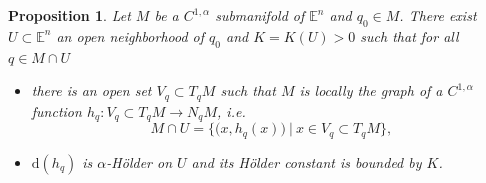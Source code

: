 \documentclass[10pt,a4paper]{amsart}
\newtheorem{proposition}{Proposition}
\newcommand{\E}{\mathbb{E}}
\renewcommand{\d}{\mathrm{d}}
\begin{document}
\begin{proposition} \label{prop: graph_constant_holder_global}
    Let $M$ be a $C^{1, \alpha}$ submanifold of $\E^n$ and $q_0 \in M$.
    There exist $U \subset \E^n$ an open neighborhood of $q_0$ and $K  = K(U) > 0$ such that for all $q \in  M \cap U$
    \begin{itemize}
        \item[(1)] there is an open set $V_q \subset T_q M$ such that $M$ is locally the graph of a $C^{1, \alpha}$ function $h_{q} : V_q \subset T_{q}M \to N_{q}M$, \textit{i.e.} 
        $$ M \cap U = \big\{ \big(x , h_{q}(x)\big) ~| ~ x \in V_q  \subset T_q M\big\}, $$
        \item[(2)] $\d (h_{q})$ is $\alpha$-Hölder on $U$ and its Hölder constant is bounded by $K$.
    \end{itemize}
\end{proposition}
\end{document}
